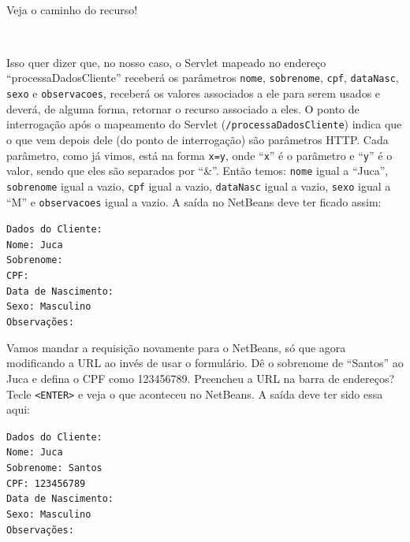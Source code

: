 \\

Veja o caminho do recurso!

\\

Isso quer dizer que, no nosso caso, o Servlet mapeado no endereço ``processaDadosCliente'' receberá os parâmetros \texttt{nome}, \texttt{sobrenome}, \texttt{cpf}, \texttt{dataNasc}, \texttt{sexo} e \texttt{observacoes}, receberá os valores associados a ele para serem usados e deverá, de alguma forma, retornar o recurso associado a eles. O ponto de interrogação após o mapeamento do Servlet (\texttt{/processaDadosCliente}) indica que o que vem depois dele (do ponto de interrogação) são parâmetros HTTP. Cada parâmetro, como já vimos, está na forma \texttt{x=y}, onde ``\texttt{x}'' é o parâmetro e ``\texttt{y}'' é o valor, sendo que eles são separados por ``\&''. Então temos: \texttt{nome} igual a ``Juca'', \texttt{sobrenome} igual a vazio, \texttt{cpf} igual a vazio, \texttt{dataNasc} igual a vazio, \texttt{sexo} igual a ``M'' e \texttt{observacoes} igual a vazio. A saída no NetBeans deve ter ficado assim:

\texttt{Dados do Cliente:}\\
\texttt{Nome: Juca}\\
\texttt{Sobrenome: }\\
\texttt{CPF: }\\
\texttt{Data de Nascimento: }\\
\texttt{Sexo: Masculino}\\
\texttt{Observações: }

Vamos mandar a requisição novamente para o NetBeans, só que agora modificando a URL ao invés de usar o formulário. Dê o sobrenome de ``Santos'' ao Juca e defina o CPF como 123456789. Preencheu a URL na barra de endereços? Tecle \texttt{<ENTER>} e veja o que aconteceu no NetBeans. A saída deve ter sido essa aqui:

\texttt{Dados do Cliente:}\\
\texttt{Nome: Juca}\\
\texttt{Sobrenome: Santos}\\
\texttt{CPF: 123456789}\\
\texttt{Data de Nascimento: }\\
\texttt{Sexo: Masculino}\\
\texttt{Observações: }

